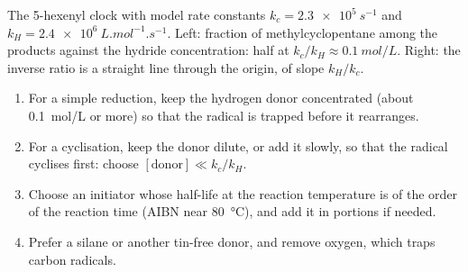 \begin{omfigure}

{\small The 5-hexenyl clock with model rate constants $k_c = \qty{2.3e5}{s^{-1}}$ and
$k_H = \qty{2.4e6}{L.mol^{-1}.s^{-1}}$. Left: fraction of methylcyclopentane among the products against the
hydride concentration: half at $k_c/k_H \approx \qty{0.1}{mol/L}$. Right: the inverse ratio is a straight
line through the origin, of slope $k_H/k_c$.}
\end{omfigure}

\begin{method}\label{met:b3:radicals-carbenes:radical-chain}
\begin{enumerate}
  \item For a simple reduction, keep the hydrogen donor concentrated (about
        \qty{0.1}{mol/L} or more) so that the radical is trapped before it rearranges.
  \item For a cyclisation, keep the donor dilute, or add it slowly, so that the
        radical cyclises first: choose $[\text{donor}] \ll k_c/k_H$.
  \item Choose an initiator whose half-life at the reaction temperature is of the
        order of the reaction time (AIBN near \qty{80}{\celsius}), and add it in portions if
        needed.
  \item Prefer a silane or another tin-free donor, and remove oxygen, which traps
        carbon radicals.
\end{enumerate}
\end{method}

